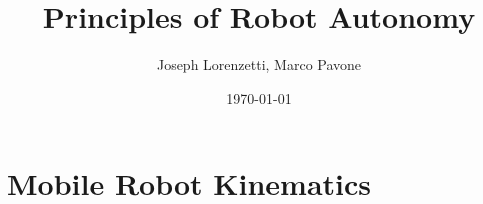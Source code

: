 \documentclass[nohyper,nobib]{tufte-book}
\title{Principles of Robot Autonomy}
\author{Joseph Lorenzetti, Marco Pavone}
\date{\today}
\begin{document}
\chapter{Mobile Robot Kinematics}


\printbibliography
\end{document}
